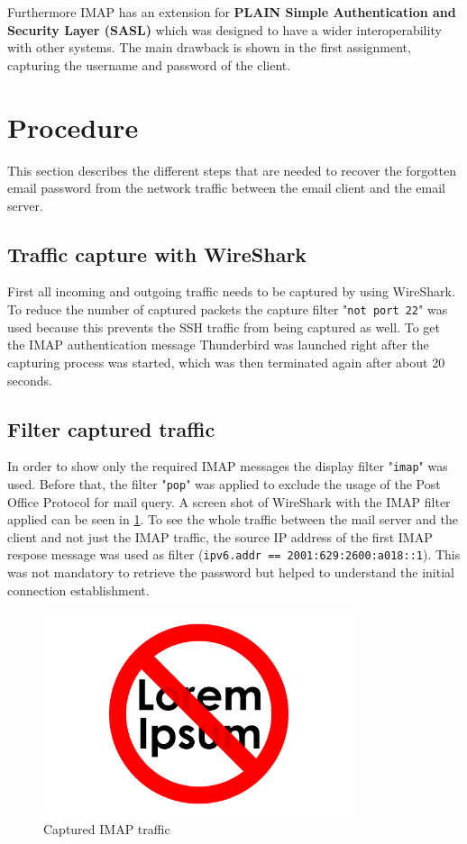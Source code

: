 \documentclass[parskip=full]{scrartcl}
\begin{document}
Furthermore IMAP has an extension for \textbf{PLAIN Simple Authentication and Security Layer (SASL)}\cite{zeilenga2006plain} which was designed to have a wider interoperability with other systems. The main drawback is shown in the first assignment, capturing the username and password of the client.

\section{Procedure} \label{sec:procedure}
This section describes the different steps that are needed to recover the forgotten email password from the network traffic between the email client and the email server. 
\subsection{Traffic capture with WireShark} \label{subsec:capture}
First all incoming and outgoing traffic needs to be captured by using WireShark. 
To reduce the number of captured packets the capture filter "\verb|not port 22|" was used because this prevents the SSH traffic from being captured as well. 
To get the IMAP authentication message Thunderbird was launched right after the capturing process was started, which was then terminated again after about 20 seconds.
\subsection{Filter captured traffic} \label{subsec:filter}
In order to show only the required IMAP messages the display filter "\verb|imap|" was used. 
Before that, the filter "\verb|pop|" was applied to exclude the usage of the Post Office Protocol for mail query. 
A screen shot of WireShark with the IMAP filter applied can be seen in \cref{fig:ws}. 
To see the whole traffic between the mail server and the client and not just the IMAP traffic, the source IP address of the first IMAP respose message was used as filter (\verb|ipv6.addr == 2001:629:2600:a018::1|).
This was not mandatory to retrieve the password but helped to understand the initial connection establishment.  

\begin{figure}[!ht]
	\centering %
	\includegraphics[height=6cm]{images/loremipsum.png} %
	\caption{Captured IMAP traffic} 
	\label{fig:ws} %
\end{figure} 
\end{document}
